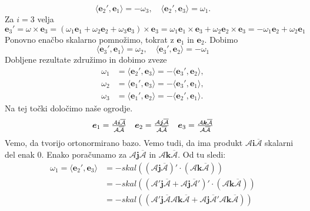 \documentclass[mat1]{fmfdelo}
\newcommand{\ii}{\boldsymbol i}
\newcommand{\jj}{\boldsymbol j}
\newcommand{\kk}{\boldsymbol k}
\newcommand{\e}{\boldsymbol e}
\newcommand{\A}{\mathcal A}
\begin{document}
\begin{dokaz}
\begin{equation*}
\langle \e_2', \e_1 \rangle  = -\omega_3, \quad 
\langle \e_2', \e_3 \rangle = \omega_1.
\end{equation*}
Za $i=3$ velja
\begin{equation*}
\e_3' = \omega \times \e_3 = (\omega_1 \e_1 + \omega_2 \e_2 + \omega_3 \e_3) \times \e_3 =
\omega_1 \e_1 \times \e_3 + \omega_2 \e_2 \times \e_3
= - \omega_1\e_2 + \omega_2\e_1
\end{equation*}
Ponovno enačbo skalarno pomnožimo, tokrat z $\e_1$ in $\e_2$. Dobimo
\begin{equation*}
\langle \e_3', \e_1 \rangle  = \omega_2, \quad
\langle \e_3', \e_2 \rangle = -\omega_1
\end{equation*}
Dobljene rezultate združimo in dobimo zveze
\begin{equation}
\begin{split}
\omega_1 &= \langle \e_2', \e_3 \rangle = - \langle \e_3', \e_2 \rangle, \\
\omega_2 &= \langle \e_1', \e_3 \rangle = - \langle \e_3', \e_1 \rangle, \\
\omega_3 &= \langle \e_1', \e_2 \rangle = - \langle \e_2', \e_1 \rangle. 
\end{split}
\end{equation}
Na tej točki določimo naše ogrodje.
\begin{equation*}
\begin{array}{c c c}
\e_1 = \frac{\A \ii \overline{\A}}{\A \overline{\A}} &
\e_2 = \frac{\A \jj \overline{\A}}{\A \overline{\A}} &
\e_3 = \frac{\A \kk \overline{\A}}{\A \overline{\A}}
\end{array}
\end{equation*}
Vemo, da tvorijo ortonormirano bazo. Vemo tudi, da ima produkt $\A \ii \overline{\A}$ skalarni del enak 0. Enako poračunamo za $\A \jj \overline{\A}$ in $\A \kk \overline{\A}$. Od tu sledi:
\begin{equation*}
\begin{split}
	\omega_1 = \langle \e_2', \e_3 \rangle& = -skal \left( \left( \A \jj \overline{\A} \right)' \cdot \left( \A \kk \overline{\A}  \right) \right) \\
	&= -skal \left( \left( \A' \jj \overline{\A} + \A \jj \overline{\A}' \right)' \cdot \left( \A \kk \overline{\A}  \right) \right) \\
	&= -skal \left( \left( \A' \jj \overline{\A} \A \kk \overline{\A}+ \A \jj \overline{\A}' \A \kk \overline{\A}  \right) \right) \\

\end{split}
\end{equation*}
\end{dokaz}
\end{document}
